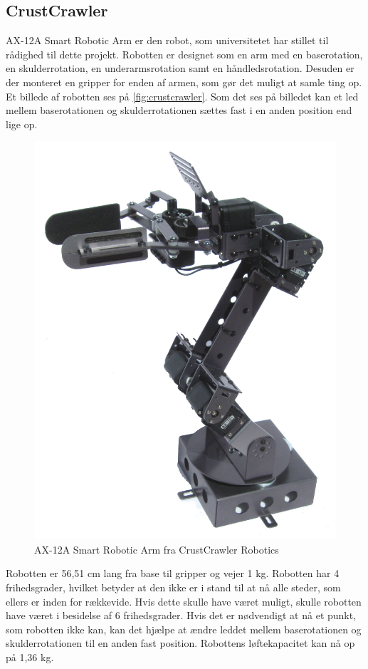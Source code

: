 \subsection{CrustCrawler}

AX-12A Smart Robotic Arm er den robot, som universitetet har stillet til rådighed til dette projekt. Robotten er designet som en arm med en baserotation, en skulderrotation, en underarmsrotation samt en håndledsrotation. Desuden er der monteret en gripper for enden af armen, som gør det muligt at samle ting op. Et billede af robotten ses på \autoref{fig:crustcrawler}. Som det ses på billedet kan et led mellem baserotationen og skulderrotationen sættes fast i en anden position end lige op. \\


\begin{figure}[h]
\centering
\includegraphics[scale=0.45]{images/crustCrawler}
\caption{AX-12A Smart Robotic Arm fra CrustCrawler Robotics}
\label{fig:crustcrawler}
\end{figure}

Robotten er 56,51 cm lang fra base til gripper og vejer 1 kg. Robotten har 4 frihedsgrader, hvilket betyder at den ikke er i stand til at nå alle steder, som ellers er inden for rækkevide. Hvis dette skulle have været muligt, skulle robotten have været i besidelse af 6 frihedsgrader. Hvis det er nødvendigt at nå et punkt, som robotten ikke kan, kan det hjælpe at ændre leddet mellem baserotationen og skulderrotationen til en anden fast position. Robottens løftekapacitet kan nå op på 1,36 kg.
